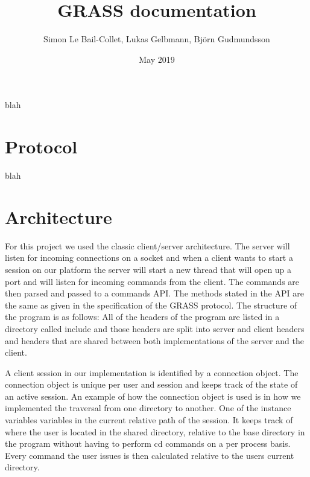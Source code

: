 \documentclass{article}
\title{GRASS documentation}
\author{Simon Le Bail-Collet, Lukas Gelbmann, Björn Gudmundsson}
\date{May 2019}
\begin{document}
\maketitle

blah

\section{Protocol}

blah

\section{Architecture}

For this project we used the classic client/server architecture. The server will listen for incoming connections on a socket and when a client wants to start
a session on our platform the server will start a new thread that will open up a port and will listen for incoming commands from the client. The commands are then parsed 
and passed to a commands API. The methods stated in the API are the same as given in the specification of the GRASS protocol. The structure of the program is as follows: All of the
headers of the program are listed in a directory called include and those headers are split into server and client headers and headers that are shared between both
implementations of the server and the client. 

A client session in our implementation is identified by a connection object. The connection object is unique per user and session and keeps track of the state of
an active session. An example of how the connection object is used is in how we implemented the traversal from one directory to another. One of the instance variables 
variables in the current relative path of the session. It keeps track of where the user is located in the shared directory, relative to the base directory in the program without having to perform
cd commands on a per process basis. Every command the user issues is then calculated relative to the users current directory. 
\end{document}

